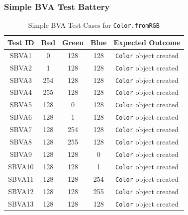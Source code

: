 \documentclass[11pt, a4paper]{article}
\begin{document}
\subsubsection{Simple BVA Test Battery}
\begin{table}[H]
\centering
\caption{Simple BVA Test Cases for \texttt{Color.fromRGB}}
\label{tab:color_simple_bva}
\begin{tabular}{ccccc}
\toprule
\textbf{Test ID} & \textbf{Red} & \textbf{Green} & \textbf{Blue} & \textbf{Expected Outcome} \\
\midrule
SBVA1  & 0   & 128 & 128 & \texttt{Color} object created \\
SBVA2  & 1   & 128 & 128 & \texttt{Color} object created \\
SBVA3  & 254 & 128 & 128 & \texttt{Color} object created \\
SBVA4  & 255 & 128 & 128 & \texttt{Color} object created \\
SBVA5  & 128 & 0   & 128 & \texttt{Color} object created \\
SBVA6  & 128 & 1   & 128 & \texttt{Color} object created \\
SBVA7  & 128 & 254 & 128 & \texttt{Color} object created \\
SBVA8  & 128 & 255 & 128 & \texttt{Color} object created \\
SBVA9  & 128 & 128 & 0   & \texttt{Color} object created \\
SBVA10 & 128 & 128 & 1   & \texttt{Color} object created \\
SBVA11 & 128 & 128 & 254 & \texttt{Color} object created \\
SBVA12 & 128 & 128 & 255 & \texttt{Color} object created \\
SBVA13 & 128 & 128 & 128 & \texttt{Color} object created \\
\bottomrule
\end{tabular}
\end{table}
\end{document}
